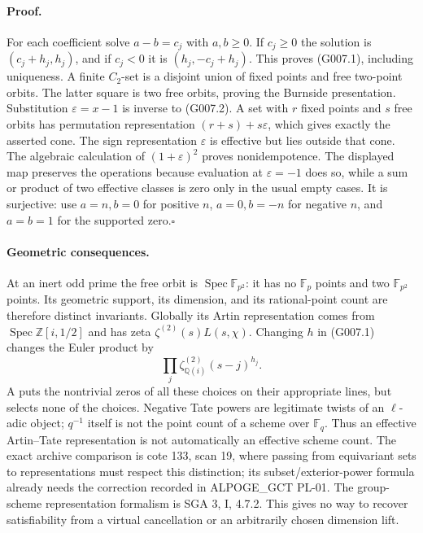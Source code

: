 \paragraph{Proof.}
For each coefficient solve $a-b=c_j$ with $a,b\ge0$. If $c_j\ge0$
the solution is $(c_j+h_j,h_j)$, and if $c_j<0$ it is
$(h_j,-c_j+h_j)$. This proves (G007.1), including uniqueness.
A finite $C_2$-set is a disjoint union of fixed points and free
two-point orbits. The latter square is two free orbits, proving
the Burnside presentation. Substitution $\varepsilon=x-1$
is inverse to (G007.2). A set with $r$ fixed points and $s$ free
orbits has permutation representation $(r+s)+s\varepsilon$,
which gives exactly the asserted cone. The sign representation
$\varepsilon$ is effective but lies outside that cone. The
algebraic calculation of $(1+\varepsilon)^2$ proves nonidempotence.
The displayed map preserves the operations because evaluation at
$\varepsilon=-1$ does so, while a sum or product of two effective
classes is zero only in the usual empty cases. It is surjective:
use $a=n,b=0$ for positive $n$, $a=0,b=-n$ for negative $n$,
and $a=b=1$ for the supported zero.\hfill$\square$

\paragraph{Geometric consequences.}
At an inert odd prime the free orbit is
$\operatorname{Spec}\mathbb F_{p^2}$: it has no $\mathbb F_p$
points and two $\mathbb F_{p^2}$ points. Its geometric support,
its dimension, and its rational-point count are therefore distinct
invariants. Globally its Artin representation comes from
$\operatorname{Spec}\mathbb Z[i,1/2]$ and has zeta
$\zeta^{(2)}(s)L(s,\chi)$.
Changing $h$ in (G007.1) changes the Euler product by
\[
 \prod_j\zeta_{\mathbb Q(i)}^{(2)}(s-j)^{h_j}.
\]
A puts the nontrivial zeros of all these choices on their
appropriate lines, but selects none of the choices. Negative
Tate powers are legitimate twists of an $\ell$-adic object;
$q^{-1}$ itself is not the point count of a scheme over
$\mathbb F_q$. Thus an effective Artin--Tate representation is
not automatically an effective scheme count.
The exact archive comparison is cote 133, scan 19, where passing
from equivariant sets to representations must respect this
distinction; its subset/exterior-power formula already needs the
correction recorded in ALPOGE\_GCT PL-01. The group-scheme
representation formalism is SGA 3, I, 4.7.2. This gives no way to
recover satisfiability from a virtual cancellation or an
arbitrarily chosen dimension lift.



